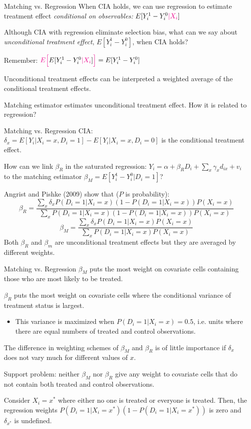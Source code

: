 \documentclass[handout]{beamer}
\begin{document}
\begin{frame}{Matching vs. Regression}
When CIA holds, we can use regression to estimate treatment effect \textit{\color{magenta} conditional on observables:} $E[Y_i^1-Y_i^0{\color{magenta} |X_i}]$\bigskip

Although CIA with regression eliminate selection bias, what can we say about \textit{\color{teal} unconditional treatment effect}, $E[Y_i^1-Y_i^0]$, when CIA holds?\pause\medskip

Remember: ${\color{magenta} E\Big[ } E[Y_i^1-Y_i^0{\color{magenta} |X_i}]{\color{magenta} \Big]} = E[Y_i^1-Y_i^0]$\medskip

Unconditional treatment effects can be interpreted a weighted average of the conditional treatment effects.\bigskip

Matching estimator estimates unconditional treatment effect. How it is related to regression?
\end{frame}


\begin{frame}{Matching vs. Regression}
CIA: $\delta_x=E[Y_i|X_i=x,D_i=1]-E[Y_i|X_i=x,D_i=0]$ is the conditional treatment effect.\medskip
 
How can we link $\beta_R$ in the saturated regression: $Y_i=\alpha+\beta_R D_i+\sum_x\gamma_x d_{ix} +v_i$ to the matching estimator $\beta_M=E[Y^1_i-Y^0_i|D_i=1]$?\medskip

Angrist and Pishke (2009) show that ($P$ is probability):
 \[\beta_R=\frac{\sum_x \delta_x P(D_i=1|X_i=x)(1-P(D_i=1|X_i=x))P(X_i=x)}{\sum_x P(D_i=1|X_i=x)(1-P(D_i=1|X_i=x))P(X_i=x)} \]
 \[\beta_M=\frac{\sum_x \delta_x P(D_i=1|X_i=x)P(X_i=x)}{\sum_x P(D_i=1|X_i=x)P(X_i=x)} \]
 Both $\beta_R$ and $\beta_m$ are unconditional treatment effects but they are averaged by different weights.
\end{frame}

\begin{frame}{Matching vs. Regression}
$\beta_M$ puts the most weight on covariate cells containing those who are most likely to be treated.\medskip

$\beta_R$  puts the most weight on covariate cells where the conditional variance of treatment status is largest. \begin{itemize}
	\item This variance is maximized when $P(D_i=1|X_i=x)=0.5$, i.e. units where there are equal numbers of treated and control observations.
\end{itemize}\medskip

The difference in weighting schemes of $\beta_M$ and $\beta_R$ is of little importance if $\delta_x$ does not vary much for different values of $x$.\medskip

Support problem: neither $\beta_M$ nor $\beta_R$ give any weight to covariate cells that do not contain both treated and control observations.\medskip

Consider $X_i=x^*$ where either no one is treated or everyone is treated. Then, the regression weights $P(D_i=1|X_i=x^*)(1-P(D_i=1|X_i=x^*))$ is zero and $\delta_{x^*}$ is undefined.
\end{frame}
\end{document}
